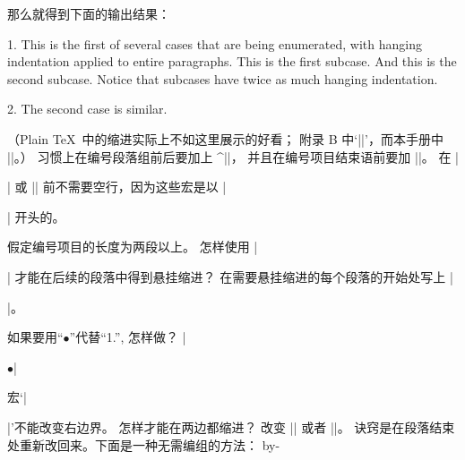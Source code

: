 \endtt
{\let\par=\endgraf 那么就得到下面的输出结果：
\medskip
\item{1.} This is the first of several cases that are being
enumerated, with hanging indentation applied to entire paragraphs.
 This is the first subcase.
 And this is the second subcase. Notice
that subcases have twice as much hanging indentation.
\item{2.} The second case is similar.
\medskip}\noindent{}
（Plain \TeX\ 中的缩进实际上不如这里展示的好看；
附录 B 中`|\parindent=20pt|'，而本手册中 |\parindent=36pt|。）
习惯上在编号段落组前后要加上 ^|\medskip|，
并且在编号项目结束语前要加 |\noindent|。%
在 |\item| 或 |\itemitem| 前不需要空行，因为这些宏是以 |\par| 开头的。

\dangerexercise 假定编号项目的长度为两段以上。
怎样使用 |\item| 才能在后续的段落中得到悬挂缩进？
\answer 在需要悬挂缩进的每个段落的开始处写上 |\item{}|。

\dangerexercise 如果要用``$\bullet$''代替``1.'', 怎样做？
\answer |\item{$\bullet$}|

\ddangerexercise \1宏`|\item|'不能改变右边界。%
怎样才能在两边都缩进？
\answer 改变 |\hsize| 或者 |\rightskip|。
诀窍是在段落结束处重新改回来。下面是一种无需编组的方法：
\begintt
\let\endgraf=\par \edef\restorehsize{\hsize=\the\hsize}
\def\par{\endgraf \restorehsize \let\par=\endgraf}
\advance\hsize by-\parindent
\endtt

